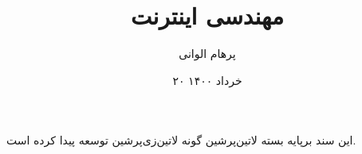 \documentclass[]{article}
\title{مهندسی اینترنت}
\author{پرهام الوانی}
\date{۲۰ خرداد ۱۴۰۰}
\begin{document}
  \maketitle
  \tableofcontents
  \pagebreak

  
  \pagebreak
  
  
  
  
  
  
  
  
  
  \vspace*{\fill}
  \begin{center}
این سند برپایه بسته ‌لاتین{‌پرشین} گونه ‌لاتین{‌زی‌پرشین} توسعه پیدا کرده است.
  \end{center}
\end{document}
